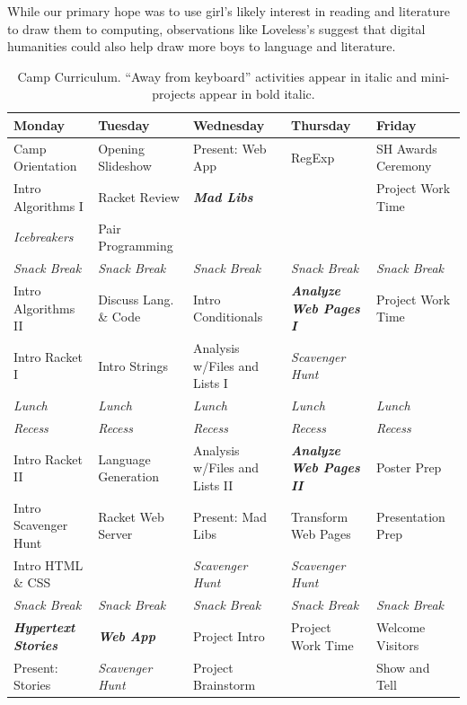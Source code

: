 While our primary hope was to use girl's likely interest in reading
and literature to draw them to computing, observations like Loveless's
suggest that digital humanities could also help draw more boys to
language and literature.


\newcommand{\afk}[1]{\textit{#1}}
\newcommand{\proj}[1]{\textit{\textbf{#1}}}

\begin{table}[t]
\begin{tabular}{|l|l|l|l|l|}
\hline
\textbf{Monday} 	& \textbf{Tuesday} 	& \textbf{Wednesday} 	& \textbf{Thursday} 		& \textbf{Friday} \\ \hline
Camp Orientation 	& Opening Slideshow 	& Present: Web App	& RegExp 			& SH Awards Ceremony \\ \hline
Intro Algorithms I	& Racket Review		& \proj{Mad Libs}	& 				& Project Work Time \\ \hline
\afk{Icebreakers}      	& Pair Programming 	& 			& 				& \\ \hline
\afk{Snack Break} & \afk{Snack Break}	& \afk{Snack Break}	& \afk{Snack Break}	& \afk{Snack Break} \\ \hline
Intro Algorithms II	& Discuss Lang. \& Code	& Intro Conditionals	& \proj{Analyze Web Pages I}	& Project Work Time \\ \hline
Intro Racket I		& Intro Strings		& Analysis w/Files and Lists I	& \afk{Scavenger Hunt}		& \\ \hline
\afk{Lunch} & \afk{Lunch}	& \afk{Lunch}	& \afk{Lunch}	& \afk{Lunch} \\ \hline
\afk{Recess} & \afk{Recess}	& \afk{Recess}	& \afk{Recess}	& \afk{Recess} \\ \hline
Intro Racket II		& Language Generation	& Analysis w/Files and Lists II	& \proj{Analyze Web Pages II} 	& Poster Prep \\ \hline
Intro Scavenger Hunt	& Racket Web Server 	& Present: Mad Libs	& Transform Web Pages		& Presentation Prep \\ \hline
Intro HTML \& CSS 	&			& \afk{Scavenger Hunt}	& \afk{Scavenger Hunt}		& \\ \hline
\afk{Snack Break} & \afk{Snack Break}	& \afk{Snack Break}	& \afk{Snack Break}	& \afk{Snack Break} \\ \hline
\proj{Hypertext Stories}& \proj{Web App}	& Project Intro 	& Project Work Time		& Welcome Visitors \\ \hline
Present: Stories 	& \afk{Scavenger Hunt}	& Project Brainstorm	& 				& Show and Tell \\ \hline
\end{tabular}
\caption{Camp Curriculum.  ``Away from keyboard'' activities appear in italic and mini-projects appear in bold italic.}
\label{table:curriculum}
\end{table}

